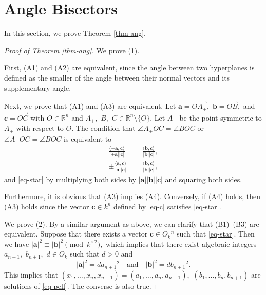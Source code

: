 \documentclass{article}
\theoremstyle{definition}
\theoremstyle{plain}
\newenvironment{pf}{\begin{proof}}{\end{proof}}
\begin{document}
\section{Angle Bisectors}\label{sec-ang}
In this section, we prove Theorem \ref{thm-ang}.
\begin{pf}[Proof of Theorem \ref{thm-ang}]
We prove (1).\par
First, (A1) and (A2) are equivalent, since the angle between two hyperplanes is defined as the smaller of the angle between their normal vectors and its supplementary angle.\par
Next, we prove that (A1) and (A3) are equivalent. 
Let $\bm{a} = \overrightarrow{OA_+},$ $\bm{b} = \overrightarrow{OB},$ and $\bm{c} = \overrightarrow{OC}$ with $O \in \mathbb R^n$ and $A_+,$ $B,$ $C \in \mathbb R^n\setminus\{ O\}.$ 
Let $A_-$ be the point symmetric to $A_+$ with respect to $O.$ 
The condition that $\angle A_+OC = \angle BOC$ or $\angle A_-OC = \angle BOC$ is equivalent to 
\begin{align*} 
\frac{\langle\pm\bm{a},\bm{c}\rangle}{|\pm\bm{a}||\bm{c}|} &= \frac{\langle\bm{b},\bm{c}\rangle}{|\bm{b}||\bm{c}|}, \\ 
\pm\frac{\langle\bm{a},\bm{c}\rangle}{|\bm{a}||\bm{c}|} &= \frac{\langle\bm{b},\bm{c}\rangle}{|\bm{b}||\bm{c}|}, 
\end{align*} 
and \eqref{eq-star} by multiplying both sides by $|\bm{a}||\bm{b}||\bm{c}|$ and squaring both sides.\par
Furthermore, it is obvious that (A3) implies (A4). 
Conversely, if (A4) holds, then (A3) holds since the vector $\bm{c} \in k^n$ defined by \eqref{eq-c} satisfies \eqref{eq-star}.\par 
We prove (2). 
By a similar argument as above, we can clarify that (B1)--(B3) are equivalent. 
Suppose that there exists a vector $\bm{c} \in O_k{}^n$ such that \eqref{eq-star}. 
Then we have $|\bm{a}|^2 \equiv |\bm{b}|^2 \pmod{k^{\times 2}},$ which implies that there exist algebraic integers $a_{n+1},$ $b_{n+1},$ $d \in O_k$ such that $d > 0$ and 
\begin{equation} 
|\bm{a}|^2 = da_{n+1}{}^2 \quad\text{and}\quad |\bm{b}|^2 = db_{n+1}{}^2. \label{eq-pels} 
\end{equation} 
This implies that $(x_1,\dots,x_n,x_{n+1}) = (a_1,\dots,a_n,a_{n+1}),$ $(b_1,\dots,b_n,b_{n+1})$ are solutions of \eqref{eq-pell}. 
The converse is also true.\qedhere
\end{pf}
\end{document}
